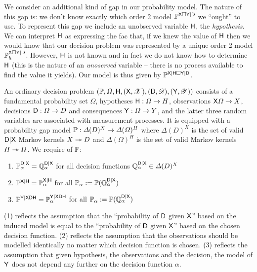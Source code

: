 We consider an additional kind of gap in our probability model. The nature of this gap is: we don't know exactly which order 2 model $\mathbb{P}^{\mathsf{X}\square \mathsf{Y}|\mathsf{D}}$ we ``ought'' to use. To represent this gap we include an unobserved variable $\mathsf{H}$, the \emph{hypothesis}. We can interpret $\mathsf{H}$ as expressing the fac that, if we knew the value of $\mathsf{H}$ then we would know that our decision problem was represented by a unique order 2 model $\mathbb{P}_h^{\mathsf{X}\square \mathsf{Y}|\mathsf{D}}$. However, $\mathsf{H}$ is not known and in fact we do not know how to determine $\mathsf{H}$ (this is the nature of an \emph{unoserved} variable -- there is no process available to find the value it yields). Our model is thus given by $\mathbb{P}^{\mathsf{X}|\mathsf{H}\square \mathsf{Y}|\mathsf{D}}$.

\begin{definition}
An ordinary decision problem $(\mathbb{P},\Omega,\mathsf{H},(\mathsf{X},\mathscr{X}),(\mathsf{D},\mathscr{D}),(\mathsf{Y},\mathscr{Y}))$ consists of a fundamental probability set $\Omega$, hypotheses $\mathsf{H}:\Omega\to H$, observations $\mathsf{X}\Omega\to X$, decisions $\mathsf{D}:\Omega\to D$ and consequences $\mathsf{Y}:\Omega\to Y$, and the latter three random variables are associated with measurement processes. It is equipped with a probability gap model $\mathbb{P}:\Delta(D)^X\to \Delta(\Omega)^H$ where $\Delta(D)^X$ is the set of valid $\mathsf{D}|\mathsf{X}$ Markov kernels $X\rightarrowtriangle D$ and $\Delta(\Omega)^H$ is the set of valid Markov kernels $H\rightarrowtriangle \Omega$. We require of $\mathbb{P}$:
\begin{enumerate}
    \item $\mathbb{P}_\alpha^{\mathsf{D}|\mathsf{X}}=\mathbb{Q}_\alpha^{\mathsf{D}|\mathsf{X}}$ for all decision functions $\mathbb{Q}_\alpha^{\mathsf{D}|\mathsf{X}}\in \Delta(D)^X$
    \item $\mathbb{P}^{\mathsf{X}|\mathsf{H}}=\mathbb{P}_\alpha^{\mathsf{X}|\mathsf{H}}$ for all $\mathbb{P}_\alpha:=\mathbb{P}(\mathbb{Q}_\alpha^{\mathsf{D}|\mathsf{X}})$
    \item $\mathbb{P}^{\mathsf{Y}|\mathsf{XDH}}=\mathbb{P}_\alpha^{\mathsf{Y}|\mathsf{XDH}}$ for all $\mathbb{P}_\alpha:=\mathbb{P}(\mathbb{Q}_\alpha^{\mathsf{D}|\mathsf{X}})$
\end{enumerate}
\end{definition}

(1) reflects the assumption that the ``probability of $\mathsf{D}$ given $\mathsf{X}$'' based on the induced model is equal to the ``probability of $\mathsf{D}$ given $\mathsf{X}$'' based on the chosen decision function. (2) reflects the assumption that the observations should be modelled identically no matter which decision function is chosen. (3) reflects the assumption that given hypothesis, the observations and the decision, the model of $\mathsf{Y}$ does not depend any further on the decision function $\alpha$.

